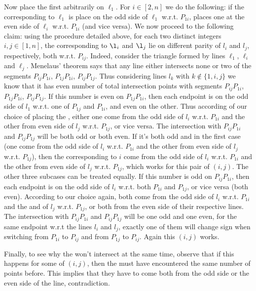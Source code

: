 \documentclass[11pt,a4paper]{article}
\begin{document}
\begin{itemize}
Now place the first \animal arbitrarily on $\ell_1$. For $i\in [2, n]$ we do the following: 
if the \animal corresponding to $\ell_1$ is place on the odd side of $\ell_1$ w.r.t. $P_{1i}$, 
\person places one \animal at the even side of $\ell_i$ w.r.t. $P_{1i}$ (and vice versa). 
We now proceed to the following claim: 
using the procedure detailed above, for each two distinct integers $i, j\in [1, n]$, 
the \animals corresponding to $\l_i$ and $\l_j$ lie on different parity of $l_i$ and $l_j$, respectively, 
both w.r.t. $P_{ij}$. 
Indeed, consider the triangle formed by lines $\ell_1$, $\ell_i$ and $\ell_j$. 
Menelaus' theorem says that any line either intersects none or two of the segments 
$P_{ij}P_{1i}$, $P_{1j}P_{1i}$, $P_{ij}P_{1j}$. 
Thus considering lines $l_k$ with $k\not\in\{1,i,j\}$ 
we know that it has even number of total intersection points with segments $P_{ij}P_{1i}$, $P_{1j}P_{1i}$, $P_{ij}P_{1j}$. 
If this number is even on $P_{1j}P_{1i}$, 
then each endpoint is on the odd side of $l_1$ w.r.t. one of $P_{1j}$ and $P_{1i}$, and even on the other. 
Thus according of our choice of placing the \animals, 
either one \animal come from the odd side of $l_i$ w.r.t. $P_{1i}$ and the other from even side of $l_j$ w.r.t. $P_{1j}$, 
or vice versa. 
The intersection with $P_{ij}P_{1i}$ and $P_{ij}P_{1j}$ will be both odd or both even. 
If it's both odd and in the first case (one \animal come from the odd side of $l_i$ w.r.t. $P_{1i}$ and the other from even side of $l_j$ w.r.t. $P_{1j}$), 
then the \animal corresponding to $i$ come from the odd side of $l_i$ w.r.t. $P_{1i}$ and the other from even side of $l_j$ w.r.t. $P_{1j}$, which works for this pair of $(i,j)$. 
The other three subcases can be treated equally. 
If this number is odd on $P_{ij}P_{1i}$, 
then each endpoint is on the odd side of $l_i$ w.r.t. both $P_{1i}$ and $P_{1j}$, or vice versa (both even). 
According to our choice again, 
both \animals come from the odd side of $l_i$ w.r.t. $P_{1i}$ and the and of $l_j$ w.r.t. $P_{1j}$, or both from the even side of their respective lines. 
The intersection with $P_{ij}P_{1i}$ and $P_{ij}P_{1j}$ will be one odd and one even, 
for the same endpoint w.r.t the lines $l_i$ and $l_j$, exactly one of them will change sign when switching from $P_{1i}$ to $P_{ij}$ and from $P_{1j}$ to $P_{ij}$. 
Again this $(i, j)$ works. 

Finally, to see why the \animals won't intersect at the same time, observe that  if this happens for some of $(i, j)$, then the \animals must have encountered the same number of points before. This implies that they have to come both from the odd side or the even side of the line, contradiction. 


\end{itemize}
\end{document}
